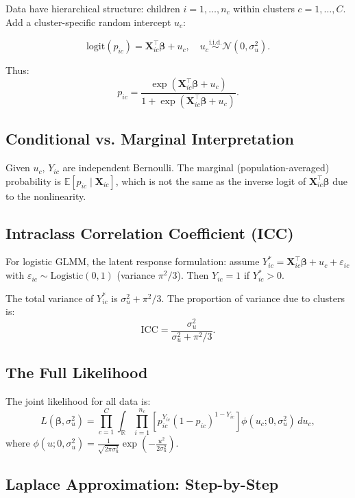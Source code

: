 \documentclass[12pt]{article}
\numberwithin{equation}{section}
\begin{document}
	Data have hierarchical structure: children $i=1,\dots,n_c$ within clusters $c=1,\dots,C$. Add a cluster-specific random intercept $u_c$:
	
	\[
	\text{logit}(p_{ic}) = \mathbf{X}_{ic}^\top \boldsymbol{\beta} + u_c, \quad u_c \overset{\text{i.i.d.}}{\sim} \mathcal{N}(0, \sigma_u^2).
	\]
	
	Thus:
	\[
	p_{ic} = \frac{\exp(\mathbf{X}_{ic}^\top \boldsymbol{\beta} + u_c)}{1 + \exp(\mathbf{X}_{ic}^\top \boldsymbol{\beta} + u_c)}.
	\]
	
	\subsection{Conditional vs. Marginal Interpretation}
	
	Given $u_c$, $Y_{ic}$ are independent Bernoulli. The marginal (population-averaged) probability is $\mathbb{E}[p_{ic} \mid \mathbf{X}_{ic}]$, which is not the same as the inverse logit of $\mathbf{X}_{ic}^\top \boldsymbol{\beta}$ due to the nonlinearity.
	
	\subsection{Intraclass Correlation Coefficient (ICC)}
	
	For logistic GLMM, the latent response formulation: assume $Y_{ic}^* = \mathbf{X}_{ic}^\top \boldsymbol{\beta} + u_c + \varepsilon_{ic}$ with $\varepsilon_{ic} \sim \text{Logistic}(0,1)$ (variance $\pi^2/3$). Then $Y_{ic} = 1$ if $Y_{ic}^* > 0$.
	
	The total variance of $Y_{ic}^*$ is $\sigma_u^2 + \pi^2/3$. The proportion of variance due to clusters is:
	\[
	\text{ICC} = \frac{\sigma_u^2}{\sigma_u^2 + \pi^2/3}.
	\]
	
	\subsection{The Full Likelihood}
	
	The joint likelihood for all data is:
	\[
	L(\boldsymbol{\beta}, \sigma_u^2) = \prod_{c=1}^C \int_{\mathbb{R}} \prod_{i=1}^{n_c} \left[ p_{ic}^{Y_{ic}} (1-p_{ic})^{1-Y_{ic}} \right] \phi(u_c; 0, \sigma_u^2) \, du_c,
	\]
	where $\phi(u; 0, \sigma_u^2) = \frac{1}{\sqrt{2\pi\sigma_u^2}} \exp\left(-\frac{u^2}{2\sigma_u^2}\right)$.
	
	\subsection{Laplace Approximation: Step-by-Step}
	
\end{document}
